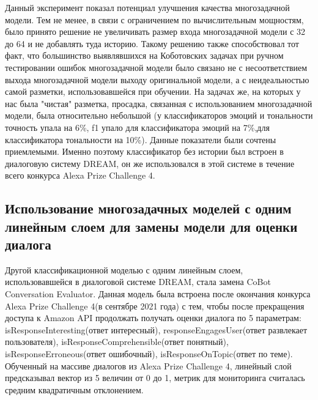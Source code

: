 \begin{table}[htbp]
\centering
\caption {Accuracy(f1) с диалоговой историей для многозадачной модели с 1 линейным слоем, только Коботовские задачи}
\label{mtldream:2}%
\end{table}

Данный эксперимент показал потенциал улучшения качества многозадачной модели. Тем не менее, в связи с ограничением по вычислительным мощностям, было принято решение не увеличивать размер входа многозадачной модели с 32 до 64 и не добавлять туда историю. Такому решению также способствовал тот факт, что большинство выявлявшихся на Коботовских задачах при ручном тестировании ошибок многозадачной модели  было связано не с несоответствием выхода многозадачной модели выходу оригинальной модели, а с неидеальностью самой разметки, использовавшейся при обучении. 
На задачах же, на которых у нас была "чистая" разметка, просадка, связанная с использованием многозадачной модели, была относительно небольшой (у классификаторов эмоций и тональности точность упала на 6\%, f1 упало для классификатора эмоций на 7\%,для классификатора тональности на 10\%). Данные показатели были сочтены приемлемыми. Именно поэтому классификатор без истории был встроен в диалоговую систему DREAM, он же использовался в этой системе в течение всего конкурса Alexa Prize Challenge 4.

\subsection{Использование многозадачных моделей с одним линейным слоем для замены модели для оценки диалога}
Другой классификационной моделью с одним линейным слоем, использовавшейся в диалоговой системе DREAM, стала замена CoBot Conversation Evaluator. Данная модель была встроена после окончания конкурса Alexa Prize Challenge 4(в сентябре 2021 года) с тем, чтобы после прекращения доступа к Amazon API продолжать получать оценки диалога по 5 параметрам: isResponseInteresting(ответ интересный), responseEngagesUser(ответ развлекает пользователя), isResponseComprehensible(ответ понятный), isResponseErroneous(ответ ошибочный), isResponseOnTopic(ответ по теме). Обученный на массиве диалогов из Alexa Prize Challenge 4, линейный слой предсказывал вектор из 5 величин от 0 до 1, метрик для мониторинга считалась средним квадратичным отклонением. 

